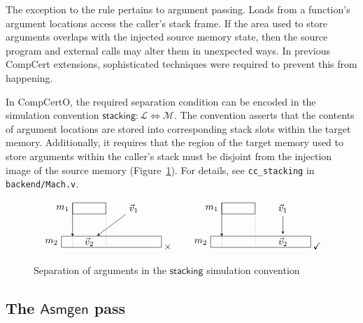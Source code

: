 \documentclass[11pt,oneside]{book}
\theoremstyle{definition}
\newcommand{\kw}[1]{\ensuremath{ \mathsf{#1} }}
\begin{document}
The exception to the rule pertains to argument passing.
Loads from a function's argument locations
access the caller's stack frame.
If the area used to store arguments
overlaps with the injected source memory state,
then the source program and external calls
may alter them in unexpected ways.
In previous CompCert extensions,
sophisticated techniques were required
to prevent this from happening.

In CompCertO,
the required separation condition can be encoded
in the simulation convention
$\kw{stacking} : \mathcal{L} \Leftrightarrow \mathcal{M}$.
The convention
asserts that the contents of argument locations
are stored into corresponding stack slots
within the target memory.
Additionally, it
requires that the region of the target memory
used to store arguments within the caller's stack
must be disjoint from the injection image of the source memory
(Figure~\ref{fig:stacking}).
For details,
see \texttt{cc\_stacking} in \texttt{backend/Mach.v}.

\begin{figure}
\[
  \begin{tikzpicture}[scale=0.4,>=stealth]
    \draw ( 1,3) rectangle +(3,1); \node[left] at (1,3.5) {$m_1$};
    \draw ( 0,0) rectangle +(9,1); \node[left] at (0,0.5) {$m_2$};
    \node (V1) at (6.5,3.5) {$\vec{v}_1$};
    \node (V2) at (2.5,0.5) {$\vec{v}_2$};
    \draw[->] (1,4) -- (1,1); \draw[dotted] (1,1) -- (1,0); \draw[dotted] (4,4) -- (4,0);
    \draw[->] (V1) -- (V2);
  \end{tikzpicture}
  \:{\times}
  \qquad
  \begin{tikzpicture}[scale=0.4,>=stealth]
    \draw ( 1,3) rectangle +(3,1); \node[left] at (1,3.5) {$m_1$};
    \draw ( 0,0) rectangle +(9,1); \node[left] at (0,0.5) {$m_2$};
    \node (V1) at (6.5,3.5) {$\vec{v}_1$};
    \node (V2) at (6.5,0.5) {$\vec{v}_2$};
    \draw[->] (1,4) -- (1,1); \draw[dotted] (1,1) -- (1,0); \draw[dotted] (4,4) -- (4,0);
    \draw[->] (V1) -- (V2);
  \end{tikzpicture}
  \:{\checkmark}
\]
  \caption{Separation of arguments
    in the \kw{stacking} simulation convention}
  \label{fig:stacking}
\end{figure}


\subsection{The \kw{Asmgen} pass} \label{sec:asmgen} %
\end{document}

